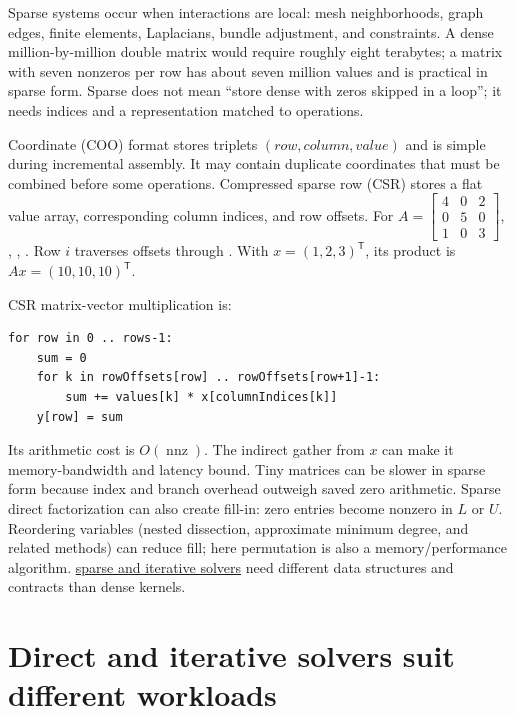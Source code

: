 Sparse systems occur when interactions are local: mesh neighborhoods, graph edges, finite elements, Laplacians, bundle adjustment, and constraints. A dense million-by-million double matrix would require roughly eight terabytes; a matrix with seven nonzeros per row has about seven million values and is practical in sparse form. Sparse does not mean ``store dense with zeros skipped in a loop''; it needs indices and a representation matched to operations.

Coordinate (COO) format stores triplets \((row,column,value)\) and is simple during incremental assembly. It may contain duplicate coordinates that must be combined before some operations. Compressed sparse row (CSR) stores a flat value array, corresponding column indices, and row offsets. For \(A=\begin{bmatrix}4&0&2\\0&5&0\\1&0&3\end{bmatrix}\), , , . Row \(i\) traverses offsets  through . With \(x=(1,2,3)^\mathsf T\), its product is \(Ax=(10,10,10)^\mathsf T\).

CSR matrix-vector multiplication is:

\begin{verbatim}
for row in 0 .. rows-1:
    sum = 0
    for k in rowOffsets[row] .. rowOffsets[row+1]-1:
        sum += values[k] * x[columnIndices[k]]
    y[row] = sum
\end{verbatim}

Its arithmetic cost is \(O(\operatorname{nnz})\). The indirect gather from \(x\) can make it memory-bandwidth and latency bound. Tiny matrices can be slower in sparse form because index and branch overhead outweigh saved zero arithmetic. Sparse direct factorization can also create fill-in: zero entries become nonzero in \(L\) or \(U\). Reordering variables (nested dissection, approximate minimum degree, and related methods) can reduce fill; here permutation is also a memory/performance algorithm. \hyperref[02-foundations-ii-ch038-sparse-storage-changes-the-cost-model]{sparse and iterative solvers} need different data structures and contracts than dense kernels.

\section{Direct and iterative solvers suit different workloads}\label{02-foundations-ii-ch038-direct-and-iterative-solvers-suit-different-workloads}


